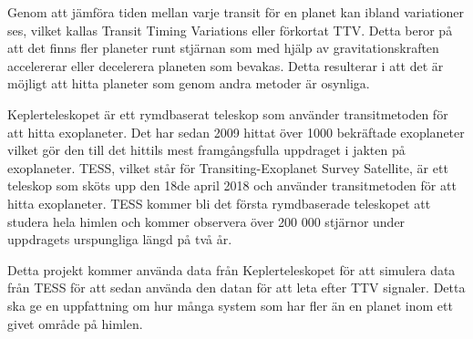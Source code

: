 \documentclass[12pt]{report}
\begin{document}
	Genom att jämföra tiden mellan varje transit för en planet kan ibland variationer ses, vilket kallas Transit Timing Variations eller förkortat TTV. Detta beror på att det finns fler planeter runt stjärnan som med hjälp av gravitationskraften accelererar eller decelerera planeten som bevakas. Detta resulterar i att det är möjligt att hitta planeter som genom andra metoder är osynliga. 
	
	Keplerteleskopet är ett rymdbaserat teleskop som använder transitmetoden för att hitta exoplaneter. Det har sedan 2009 hittat över 1000 bekräftade exoplaneter vilket gör den till det hittils mest framgångsfulla uppdraget i jakten på exoplaneter. TESS, vilket står för Transiting-Exoplanet Survey Satellite, är ett teleskop som sköts upp den 18de april 2018 och använder transitmetoden för att hitta exoplaneter. TESS kommer bli det första rymdbaserade teleskopet att studera hela himlen och kommer observera över 200 000 stjärnor under uppdragets urspungliga längd på två år.
	
	Detta projekt kommer använda data från Keplerteleskopet för att simulera data från TESS för att sedan använda den datan för att leta efter TTV signaler. Detta ska ge en uppfattning om hur många system som har fler än en planet inom ett givet område på himlen.
	
	



\newpage

\thispagestyle{empty}
\mbox{} %

\newpage

\setcounter{page}{1} %

\tableofcontents

\newpage

\listoffigures 
\listoftables

\newpage
\end{document}
